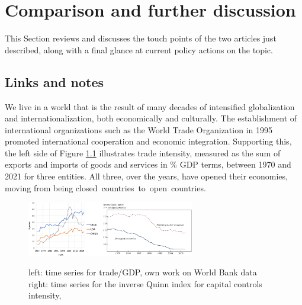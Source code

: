 \chapter{Comparison and further discussion}

\vspace{-25pt}
This Section reviews and discusses the touch points of the two articles just described, along with a final glance at current policy actions on the topic.
\vspace{-15pt}

\section{Links and notes}
\vspace{-8pt}
We live in a world that is the result of many decades of intensified globalization and internationalization, both economically and culturally. The establishment of international organizations such as the World Trade Organization in 1995 promoted international cooperation and economic integration. Supporting this, the left side of Figure \ref{img:trade} illustrates trade intensity, measured as the sum of exports and imports of goods and services in \% GDP terms, between 1970 and 2021 for three entities. All three, over the years, have opened their economies, moving from being closed~countries~to~open~countries.

\begin{figure}[!h]
    \centering
    \captionsetup{font=footnotesize,justification=centering}\caption{left: time series for trade/GDP, own work on World Bank data\\right: time series for the inverse Quinn index for capital controls intensity, \textcite{klein}}
    \includegraphics[width=0.65\textwidth]{img/trade-and-controls.jpg}
    \label{img:trade}
    \vspace{-5pt}
\end{figure}

